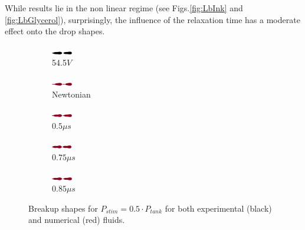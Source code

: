 \documentclass[onecolumn, 12pt]{asme2ej}
\begin{document}
While results lie in the non linear regime (see Figs.\ref{fig:LbInk} and \ref{fig:LbGlycerol}), surprisingly, the influence of the relaxation time has a moderate effect onto the drop shapes.

\begin{figure}[]

    \begin{subfigure}[t]{1.6cm}
        \centering
        \includegraphics[angle=-90,origin=c,width=0.9cm]{Figures/Fig15a.eps}        
        \caption{54.5$V$}
    \end{subfigure}
    \hfill
    \begin{subfigure}[t]{1.7cm}
        \centering
        \includegraphics[angle=-90,origin=c,width=0.9cm]{Figures/Fig15b.eps}

        \caption{Newtonian}
    \end{subfigure}
    \hfill
    \begin{subfigure}[t]{1.6cm}
        \centering
        \includegraphics[angle=-90,origin=c,width=0.9cm]{Figures/Fig15c.eps}
        \caption{$0.5\mu s$}
    \end{subfigure}\hfill
    \begin{subfigure}[t]{1.6cm}
        \centering
        \includegraphics[angle=-90,origin=c,width=0.9cm]{Figures/Fig15d.eps}
        \caption{$0.75\mu s$}
    \end{subfigure}
    \hfill
    \begin{subfigure}[t]{1.6cm}
        \centering
        \includegraphics[angle=-90,origin=c,width=0.9cm]{Figures/Fig15e.eps}
        \caption{$0.85\mu s$}
    \end{subfigure}
    \caption{Breakup shapes for $P_{stim}=0.5\cdot P_{tank}$ for both experimental (black) and numerical (red) fluids.}
    \label{fig:A5}
\end{figure}
\end{document}
